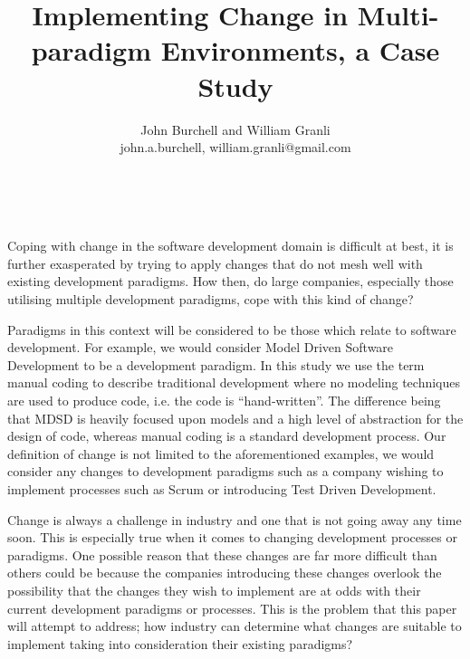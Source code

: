 \documentclass[10pt,twocolumn]{article}
\begin{document}
\title{Implementing Change in Multi-paradigm Environments, a Case Study}

\author{John Burchell and William Granli \\
john.a.burchell, william.granli@gmail.com}


\maketitle
\thispagestyle{empty}




​

Coping with change in the software development domain is difficult at best, it is further exasperated by trying to apply changes that do not mesh well with existing development paradigms. How then, do large companies, especially those utilising multiple development paradigms, cope with this kind of change?

Paradigms in this context will be considered to be those which relate to software development. For example, we would consider Model Driven Software Development to be a development paradigm. In this study we use the term manual coding to describe traditional development where no modeling techniques are used to produce code, i.e. the code is ``hand-written''. The difference being that MDSD is heavily focused upon models and a high level of abstraction for the design of code, whereas manual coding is a standard development process. Our definition of change is not limited to the aforementioned examples, we would consider any changes to development paradigms such as a company wishing to implement processes such as Scrum or introducing Test Driven Development.

Change is always a challenge in industry and one that is not going away any time soon. This is especially true when it comes to changing development processes or paradigms. One possible reason that these changes are far more difficult than others could be because the companies introducing these changes overlook the possibility that the changes they wish to implement are at odds with their current development paradigms or processes. This is the problem that this paper will attempt to address; how industry can determine what changes are suitable to implement taking into consideration their existing paradigms?
\end{document}
